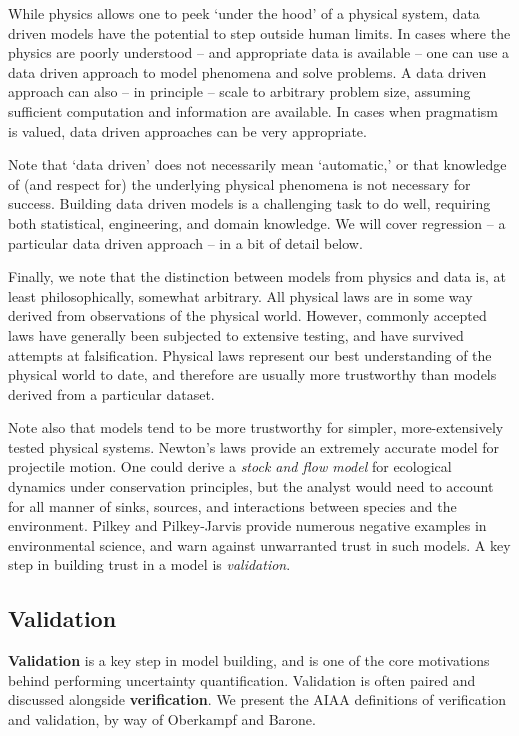 \documentclass[../primer.tex]{subfiles}
\begin{document}
While physics allows one to peek `under the hood' of a physical system, data
driven models have the potential to step outside human limits. In cases where
the physics are poorly understood -- and appropriate data is available -- one
can use a data driven approach to model phenomena and solve problems. A data
driven approach can also -- in principle -- scale to arbitrary problem size,
assuming sufficient computation and information are available. In cases when
pragmatism is valued, data driven approaches can be very appropriate.

Note that `data driven' does not necessarily mean `automatic,' or that knowledge
of (and respect for) the underlying physical phenomena is not necessary for
success. Building data driven models is a challenging task to do well, requiring
both statistical, engineering, and domain knowledge. We will cover regression --
a particular data driven approach -- in a bit of detail below.

Finally, we note that the distinction between models from physics and data is,
at least philosophically, somewhat arbitrary. All physical laws are in some way
derived from observations of the physical world. However, commonly accepted laws
have generally been subjected to extensive testing, and have survived attempts
at falsification.\cite{popper2005logic} Physical laws represent our best
understanding of the physical world to date, and therefore are usually more
trustworthy than models derived from a particular dataset.

Note also that models tend to be more trustworthy for simpler, more-extensively
tested physical systems. Newton's laws provide an extremely accurate model for
projectile motion. One could derive a \emph{stock and flow model} for ecological
dynamics under conservation principles, but the analyst would need to account
for all manner of sinks, sources, and interactions between species and the
environment. Pilkey and Pilkey-Jarvis\cite{pilkey2007useless} provide numerous
negative examples in environmental science, and warn against unwarranted trust
in such models. A key step in building trust in a model is \emph{validation}.

\subsection{Validation}
\textbf{Validation} is a key step in model building, and is one of the core
motivations behind performing uncertainty quantification. Validation is often
paired and discussed alongside \textbf{verification}. We present the AIAA
definitions of verification and validation, by way of Oberkampf and
Barone.\cite{oberkampf2006measures}
\end{document}
